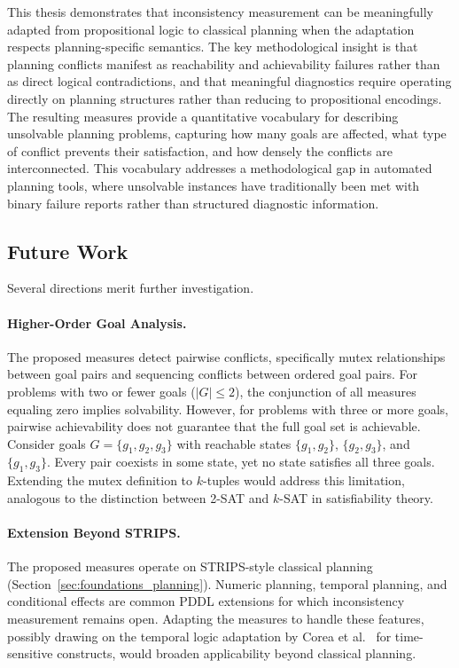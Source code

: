 This thesis demonstrates that inconsistency measurement can be meaningfully a\-dapted from propositional logic to classical planning when the adaptation respects planning-specific semantics. The key methodological insight is that planning conflicts manifest as reachability and achievability failures rather than as direct logical contradictions, and that meaningful diagnostics require operating directly on planning structures rather than reducing to propositional encodings. The resulting measures provide a quantitative vocabulary for describing unsolvable planning problems, capturing how many goals are affected, what type of conflict prevents their satisfaction, and how densely the conflicts are interconnected. This vocabulary addresses a methodological gap in automated planning tools, where unsolvable instances have traditionally been met with binary failure reports rather than structured diagnostic information.

\subsection{Future Work}

Several directions merit further investigation.

\paragraph{Higher-Order Goal Analysis.}
The proposed measures detect pairwise conflicts, specifically mutex relationships between goal pairs and sequencing conflicts between ordered goal pairs. For problems with two or fewer goals ($|G| \leq 2$), the conjunction of all measures equaling zero implies solvability. However, for problems with three or more goals, pairwise achievability does not guarantee that the full goal set is achievable. Consider goals $G = \{g_1, g_2, g_3\}$ with reachable states $\{g_1, g_2\}$, $\{g_2, g_3\}$, and $\{g_1, g_3\}$. Every pair coexists in some state, yet no state satisfies all three goals. Extending the mutex definition to $k$-tuples would address this limitation, analogous to the distinction between 2-SAT and $k$-SAT in satisfiability theory.

\paragraph{Extension Beyond STRIPS.}
The proposed measures operate on \ac{STRIPS}-style \linebreak classical planning (Section~\ref{sec:foundations_planning}). Numeric planning, temporal planning, and conditional effects are common \ac{PDDL} extensions for which inconsistency measurement remains open. Adapting the measures to handle these features, possibly drawing on the temporal logic adaptation by Corea et al.~\cite{Corea2022} for time-sensitive constructs, would broaden applicability beyond classical planning.

